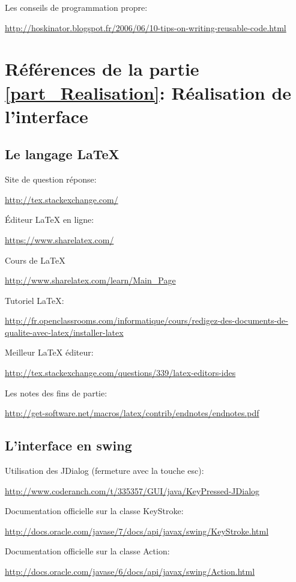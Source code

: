 \documentclass[french]{article}
\begin{document}
  Les conseils de programmation propre:

  \url{http://hoskinator.blogspot.fr/2006/06/10-tips-on-writing-reusable-code.html}


\section{Références de la partie \ref{part_Realisation}: Réalisation de l'interface}


  \subsection{Le langage \LaTeX{}}

    Site de question réponse:

    \url{http://tex.stackexchange.com/}

    Éditeur \LaTeX{} en ligne:

    \url{https://www.sharelatex.com/}

    Cours de \LaTeX{}

    \url{http://www.sharelatex.com/learn/Main\_Page}

    Tutoriel \LaTeX{}:

    \url{http://fr.openclassrooms.com/informatique/cours/redigez-des-documents-de-qualite-avec-latex/installer-latex}

    Meilleur \LaTeX{} éditeur:

    \url{http://tex.stackexchange.com/questions/339/latex-editors-ides}

    Les notes des fins de partie:

    \url{http://get-software.net/macros/latex/contrib/endnotes/endnotes.pdf}


  \subsection{L'interface en swing}

    Utilisation des JDialog (fermeture avec la touche esc):

    \url{http://www.coderanch.com/t/335357/GUI/java/KeyPressed-JDialog}

    Documentation officielle sur la classe KeyStroke:

    \url{http://docs.oracle.com/javase/7/docs/api/javax/swing/KeyStroke.html}

    Documentation officielle sur la classe Action:

    \url{http://docs.oracle.com/javase/6/docs/api/javax/swing/Action.html}
\end{document}
